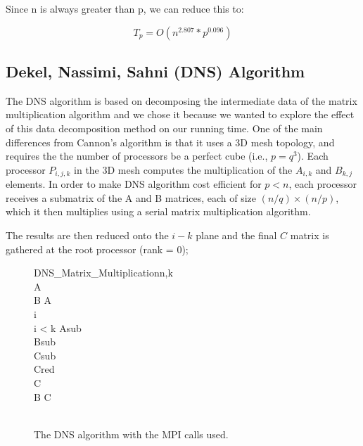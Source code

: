 \documentclass{article}
\begin{document}
Since n is always greater than p, we can reduce this to:

$$	T_p = O(n^{2.807} * p^{0.096})$$




\subsection{Dekel, Nassimi, Sahni (DNS) Algorithm}

The DNS algorithm is based on decomposing the intermediate data of the matrix
multiplication algorithm and we chose it because we wanted to explore the effect
of this data decomposition method on our running time. One of the main
differences from Cannon's algorithm is that it uses a 3D mesh topology, and
requires the the number of processors be a perfect cube (i.e., $p = q^3$). Each
processor $P_{i,j,k}$ in the 3D mesh computes the multiplication of the
$A_{i,k}$ and $B_{k,j}$ elements.  In order to make DNS algorithm cost efficient
for $p < n$, each processor receives a submatrix of the A and B matrices, each
of size $(n/q) \times (n/p)$, which it then multiplies using a serial matrix
multiplication algorithm.

The results are then reduced onto the $i-k$ plane and the final $C$ matrix is
gathered at the root processor (rank = 0);

\begin{figure}

\begin{pseudocode}[ruled]{DNS\_Matrix\_Multiplication}{n,k}
 \\
A \GETS {} \\
B \GETS A \\
i  \\

\WHILE i < k \DO
\BEGIN
	Asub \GETS {} \\
	Bsub \GETS {} \\
	Csub \GETS {} \\
	
	Cred \GETS {} \\
	C \GETS {} \\

	B \GETS C \\
\END \vspace{10pt} \\

\end{pseudocode}
\caption{The DNS algorithm with the MPI calls used.}
\end{figure}
\end{document}
